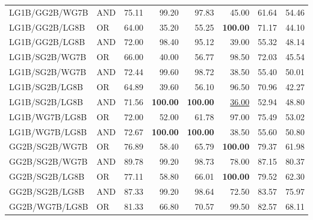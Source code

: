 \documentclass{article}
\begin{document}
{\begin{longtable}{llrrrrrr}
 LG1B/GG2B/WG7B           & AND     & 75.11             & 99.20             & 97.83             & 45.00             & 61.64             & 54.46            \\
 LG1B/GG2B/LG8B           & OR      & 64.00             & 35.20             & 55.25             & \textbf{100.00}   & 71.17             & 44.10            \\
 LG1B/GG2B/LG8B           & AND     & 72.00             & 98.40             & 95.12             & 39.00             & 55.32             & 48.14            \\
 LG1B/SG2B/WG7B           & OR      & 66.00             & 40.00             & 56.77             & 98.50             & 72.03             & 45.54            \\
 LG1B/SG2B/WG7B           & AND     & 72.44             & 99.60             & 98.72             & 38.50             & 55.40             & 50.01            \\
 LG1B/SG2B/LG8B           & OR      & 64.89             & 39.60             & 56.10             & 96.50             & 70.96             & 42.27            \\
 LG1B/SG2B/LG8B           & AND     & 71.56             & \textbf{100.00}   & \textbf{100.00}   & \underline{36.00} & 52.94             & 48.80            \\
 LG1B/WG7B/LG8B           & OR      & 72.00             & 52.00             & 61.78             & 97.00             & 75.49             & 53.02            \\
 LG1B/WG7B/LG8B           & AND     & 72.67             & \textbf{100.00}   & \textbf{100.00}   & 38.50             & 55.60             & 50.80            \\
 GG2B/SG2B/WG7B           & OR      & 76.89             & 58.40             & 65.79             & \textbf{100.00}   & 79.37             & 61.98            \\
 GG2B/SG2B/WG7B           & AND     & 89.78             & 99.20             & 98.73             & 78.00             & 87.15             & 80.37            \\
 GG2B/SG2B/LG8B           & OR      & 77.11             & 58.80             & 66.01             & \textbf{100.00}   & 79.52             & 62.30            \\
 GG2B/SG2B/LG8B           & AND     & 87.33             & 99.20             & 98.64             & 72.50             & 83.57             & 75.97            \\
 GG2B/WG7B/LG8B           & OR      & 81.33             & 66.80             & 70.57             & 99.50             & 82.57             & 68.11            \\

\end{longtable}}
\end{document}
